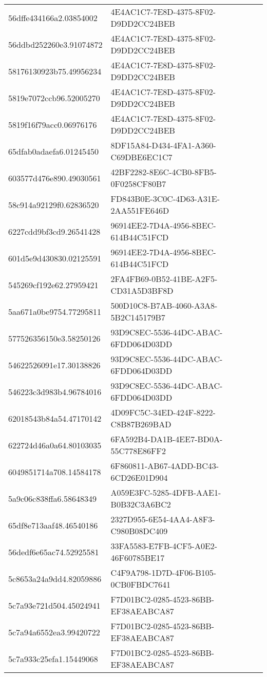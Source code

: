 \begin{tabular}{ll}
56dffe434166a2.03854002 & 4E4AC1C7-7E8D-4375-8F02-D9DD2CC24BEB \\
56ddbd252260e3.91074872 & 4E4AC1C7-7E8D-4375-8F02-D9DD2CC24BEB \\
58176130923b75.49956234 & 4E4AC1C7-7E8D-4375-8F02-D9DD2CC24BEB \\
5819e7072ccb96.52005270 & 4E4AC1C7-7E8D-4375-8F02-D9DD2CC24BEB \\
5819f16f79acc0.06976176 & 4E4AC1C7-7E8D-4375-8F02-D9DD2CC24BEB \\
65dfab0adaefa6.01245450 & 8DF15A84-D434-4FA1-A360-C69DBE6EC1C7 \\
603577d476e890.49030561 & 42BF2282-8E6C-4CB0-8FB5-0F0258CF80B7 \\
58c914a92129f0.62836520 & FD843B0E-3C0C-4D63-A31E-2AA551FE646D \\
6227cdd9bf3cd9.26541428 & 96914EE2-7D4A-4956-8BEC-614B44C51FCD \\
601d5e9d430830.02125591 & 96914EE2-7D4A-4956-8BEC-614B44C51FCD \\
545269cf192e62.27959421 & 2FA4FB69-0B52-41BE-A2F5-CD31A5D3BF8D \\
5aa671a0be9754.77295811 & 500D10C8-B7AB-4060-A3A8-5B2C145179B7 \\
577526356150e3.58250126 & 93D9C8EC-5536-44DC-ABAC-6FDD064D03DD \\
54622526091e17.30138826 & 93D9C8EC-5536-44DC-ABAC-6FDD064D03DD \\
546223c3d983b4.96784016 & 93D9C8EC-5536-44DC-ABAC-6FDD064D03DD \\
62018543b84a54.47170142 & 4D09FC5C-34ED-424F-8222-C8B87B269BAD \\
622724d46a0a64.80103035 & 6FA592B4-DA1B-4EE7-BD0A-55C778E86FF2 \\
6049851714a708.14584178 & 6F860811-AB67-4ADD-BC43-6CD26E01D904 \\
5a9c06c838ffa6.58648349 & A059E3FC-5285-4DFB-AAE1-B0B32C3A6BC2 \\
65df8e713aaf48.46540186 & 2327D955-6E54-4AA4-A8F3-C980B08DC409 \\
56dedf6e65ac74.52925581 & 33FA5583-E7FB-4CF5-A0E2-46F60785BE17 \\
5c8653a24a9dd4.82059886 & C4F9A798-1D7D-4F06-B105-0CB0FBDC7641 \\
5c7a93e721d504.45024941 & F7D01BC2-0285-4523-86BB-EF38AEABCA87 \\
5c7a94a6552ea3.99420722 & F7D01BC2-0285-4523-86BB-EF38AEABCA87 \\
5c7a933c25efa1.15449068 & F7D01BC2-0285-4523-86BB-EF38AEABCA87 \\

\end{tabular}
